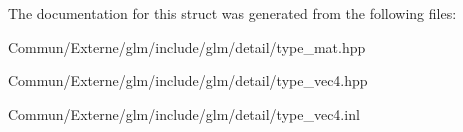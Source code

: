 The documentation for this struct was generated from the following files\+:\begin{DoxyCompactItemize}
\item 
Commun/\+Externe/glm/include/glm/detail/type\+\_\+mat.\+hpp\item 
Commun/\+Externe/glm/include/glm/detail/type\+\_\+vec4.\+hpp\item 
Commun/\+Externe/glm/include/glm/detail/type\+\_\+vec4.\+inl\end{DoxyCompactItemize}
